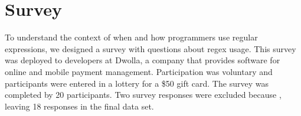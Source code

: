 \section{Survey}
\label{sec:survey}

To understand the context of when and how programmers use regular expressions, 
we designed a survey with  questions about regex usage. This survey was 
deployed to developers at Dwolla, a company that provides software for
 online and mobile payment management. 
Participation was voluntary and participants were entered in a lottery for a \$50 gift card. 
The survey was completed by 20 participants. Two survey responses were excluded
because , leaving 18 responses in the final data set. 

